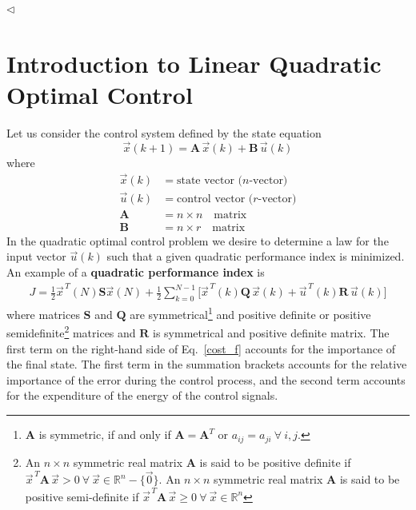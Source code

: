 \documentclass[12pt,a4paper,oneside]{book}
\begin{document}
\begin{onehalfspace}
\begin{example}
	$\triangleleft$ 
\end{example}




\section{Introduction to Linear Quadratic Optimal Control}
Let us consider the control system defined by the state equation
\begin{equation}\label{system}
	\vec{x}(k+1) = \mathbf{A}\,\vec{x}(k)+\mathbf{B}\,\vec{u}(k) 
\end{equation}
where
\begin{equation*}
	\begin{aligned}
		\vec{x}(k) &= \text{state vector ($n$-vector)} \\[6pt]
		\vec{u}(k) &= \text{control vector ($r$-vector)} \\[6pt]
		\mathbf{A} &= n \times n\quad\text{matrix} \\[6pt]
		\mathbf{B} &= n \times r\quad\text{matrix}
	\end{aligned}
\end{equation*}
In the quadratic optimal control problem we desire to determine a law for the input vector $\vec{u}(k)$ such that a given quadratic performance index is minimized. An example of a \textbf{quadratic performance index} is 
\begin{equation}\label{cost_f}
	\begin{aligned}
		J = 
		\frac{1}{2}\vec{x}^{\,T}(N)\mathbf{S}\vec{x}(N)+\frac{1}{2}\sum_{k=0}^{N-1}
		\Big[\vec{x}^{\,T}(k)\mathbf{Q}\,\vec{x}(k) + 
		\vec{u}^{\,T}(k)\mathbf{R}\,\vec{u}(k)\Big]
	\end{aligned}
\end{equation}
where matrices $\mathbf{S}$ and $\mathbf{Q}$ are symmetrical\footnote{$\mathbf{A}$ is symmetric, if and only if $\mathbf{A}=\mathbf{A}^T$ or $a_{ij}=a_{ji}\ \forall\ i,j$.} and positive 
definite or positive semidefinite\footnote{An $n\times n$ symmetric real matrix $\mathbf{A}$ is said to be positive definite if $\vec{x}^{\,T}\mathbf{A}\,\vec{x}>0\ \forall\ \vec{x}\in\mathbb{R}^n-\big\{\vec{0}\big\}$. An $n\times n$ symmetric real matrix $\mathbf{A}$ is said to be positive semi-definite if $\vec{x}^{\,T}\mathbf{A}\,\vec{x}\ge0\ \forall\ \vec{x}\in\mathbb{R}^n$} matrices and $\mathbf{R}$ is symmetrical and 
positive definite matrix. The first term on the right-hand side of 
Eq.~\eqref{cost_f} accounts for the importance of the final state. The first 
term in the summation brackets accounts for the relative importance of the 
error during the 
control process, and the second term accounts for the expenditure of the energy 
of the control signals.


\end{onehalfspace}
\end{document}
